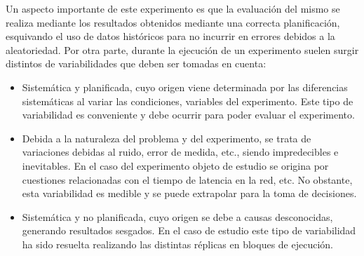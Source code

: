 Un aspecto importante de este experimento es que la evaluación del mismo se realiza mediante los resultados obtenidos mediante 
una correcta planificación, esquivando el uso de datos históricos para no incurrir en errores debidos a la aleatoriedad. Por otra parte, 
durante la ejecución de un experimento suelen surgir distintos de variabilidades que deben ser tomadas en cuenta:
\begin{itemize}
 \item Sistemática y planificada, cuyo origen viene determinada por las diferencias sistemáticas al variar las condiciones, 
variables del experimento. Este tipo de variabilidad es conveniente y debe ocurrir para poder evaluar el experimento.
\item Debida a la naturaleza del problema y del experimento, se trata de variaciones debidas al ruido, error de medida, etc., siendo 
 impredecibles e inevitables. En el caso del experimento objeto de estudio se origina por cuestiones relacionadas con 
el tiempo de latencia en la red, etc. No obstante, esta variabilidad es medible y se puede extrapolar para la toma 
de decisiones.
\item Sistemática y no planificada, cuyo origen se debe a causas desconocidas, generando resultados sesgados. En el caso 
de estudio este tipo de variabilidad ha sido resuelta realizando las distintas réplicas en bloques de ejecución.
\end{itemize}

